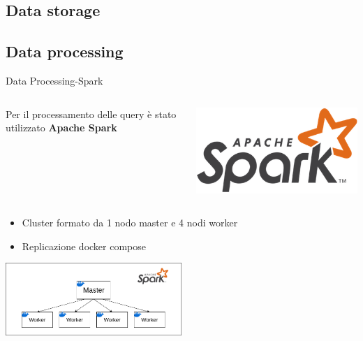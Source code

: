 \documentclass[13pt,aspectratio=169,t,xcolor=table]{beamer}
\begin{document}
\subsection{Data storage}
\subsection{Data processing}
\begin{frame}{Data Processing-Spark}
    \begin{columns}
    
            Per il processamento delle query è stato utilizzato \textbf{Apache Spark}
        
            \begin{minipage}{0.5\textwidth}
                \raggedleft
                \includegraphics[width=1\textwidth]{res/spark_icon.png}
            \end{minipage}
    \end{columns}

    \vspace{0.5cm}
    
    \begin{itemize}
        \item Cluster formato da 1 nodo master e 4 nodi worker
        \item Replicazione docker compose
    \end{itemize}
    \begin{adjustbox}{margin=0.5cm, center}
        \includegraphics[width=0.5\textwidth]{res/spark_cluster.png}
    \end{adjustbox}


\end{frame}
\end{document}
